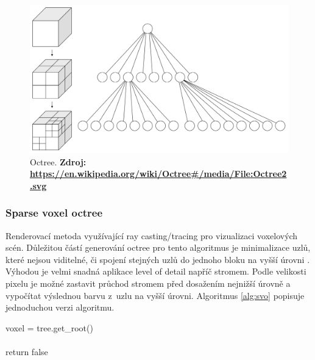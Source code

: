 \begin{figure}[H]
	\centering
	\includegraphics[scale=0.1]{obrazky-figures/Octree2.pdf}
	\caption{Octree. \textbf{Zdroj: \url{https://en.wikipedia.org/wiki/Octree#/media/File:Octree2.svg}}}
	\label{fig:slabs}
\end{figure}


\subsubsection{Sparse voxel octree}\label{svo_alg}
Renderovací metoda využívající ray casting/tracing pro vizualizaci voxelových scén. Důležitou částí generování octree pro tento algoritmus je minimalizace uzlů, které nejsou viditelné, či spojení stejných uzlů do jednoho bloku na vyšší úrovni \cite{Laine2011EfficientSV}. Výhodou je velmi snadná aplikace level of detail napříč stromem. Podle velikosti pixelu je možné zastavit průchod stromem před dosažením nejnižší úrovně a vypočítat výslednou barvu z~uzlu na vyšší úrovni. Algoritmus \ref{alg:svo} popisuje jednoduchou verzi algoritmu.

\begin{center}
	\begin{czechalgorithm}[H] \label{alg:svo}
		voxel = tree.get\_root()\\
		\\
		return false
		\caption{Sparse voxel octree ray casting}
	\end{czechalgorithm}
\end{center}


